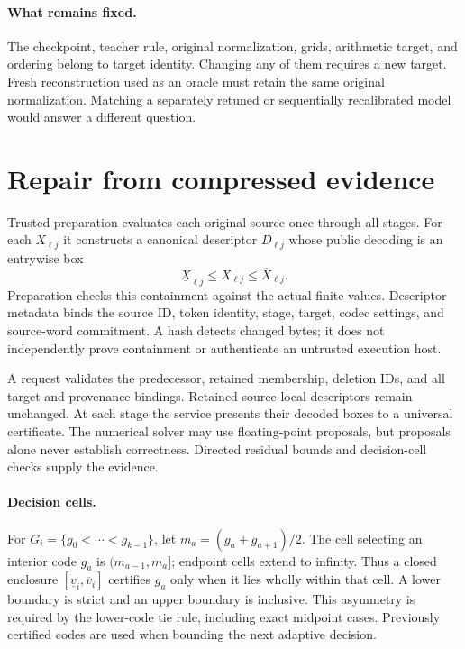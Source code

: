 \documentclass[10pt,twocolumn,letterpaper]{article}
\begin{document}
\paragraph{What remains fixed.}
The checkpoint, teacher rule, original normalization, grids, arithmetic target, and
ordering belong to target identity. Changing any of them requires a new target.
Fresh reconstruction used as an oracle must retain the same original
normalization. Matching a separately retuned or sequentially recalibrated model
would answer a different question.

\section{Repair from compressed evidence}
\label{sec:method}
Trusted preparation evaluates each original source once through all stages.
For each $X_{\ell j}$ it constructs a canonical descriptor $D_{\ell j}$ whose
public decoding is an entrywise box
\begin{equation}
 \underline X_{\ell j}\leq X_{\ell j}\leq\overline X_{\ell j}.
 \label{eq:containment}
\end{equation}
Preparation checks this containment against the actual finite values. Descriptor
metadata binds the source ID, token identity, stage, target, codec settings, and
source-word commitment. A hash detects changed bytes; it does not independently
prove containment or authenticate an untrusted execution host.

A request validates the predecessor, retained membership, deletion IDs, and all
target and provenance bindings. Retained source-local descriptors remain
unchanged. At each stage the service presents their decoded boxes to a universal
certificate. The numerical solver may use floating-point proposals, but proposals
alone never establish correctness. Directed residual bounds and decision-cell
checks supply the evidence.

\paragraph{Decision cells.}
For $G_i=\{g_0<\cdots<g_{k-1}\}$, let
$m_a=(g_a+g_{a+1})/2$. The cell selecting an interior code $g_a$ is
$(m_{a-1},m_a]$; endpoint cells extend to infinity. Thus a closed enclosure
$[\underline v_i,\overline v_i]$ certifies $g_a$ only when it lies wholly within
that cell. A lower boundary is strict and an upper boundary is inclusive. This
asymmetry is required by the lower-code tie rule, including exact midpoint cases.
Previously certified codes are used when bounding the next adaptive decision.
\end{document}
